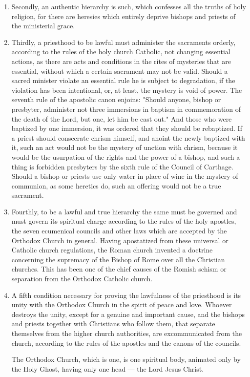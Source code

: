 \begin{enumerate}
    \item Secondly, an authentic hierarchy is such, 
    which confesses all the truths of holy religion, 
    for there are heresies which entirely deprive 
    bishops and priests of the ministerial grace. 

    \item Thirdly, a priesthood to be lawful must 
    administer the sacraments orderly, according 
    to the rules of the holy church Catholic, not 
    changing essential actions, as there are acts and 
    conditions in the rites of mysteries that are essential,
    without which a certain sacrament may 
    not be valid. Should a sacred minister violate 
    an essential rule he is subject to degradation, if 
    the violation has been intentional, or, at least, 
    the mystery is void of power. The seventh 
    rule of the apostolic canon enjoins: "Should 
    anyone, bishop or presbyter, administer not 
    three immersions in baptism in commemoration 
    of the death of the Lord, but one, let him be cast 
    out." And those who were baptized by one 
    immersion, it was ordered that they should be 
    rebaptized. If a priest should consecrate 
    chrism himself, and anoint the newly baptized 
    with it, such an act would not be the mystery of 
    unction with chrism, because it would be the 
    usurpation of the rights and the power of a 
    bishop, and such a thing is forbidden presbyters
    by the sixth rule of the Council of Carthage.
    Should a bishop or priests use only water 
    in place of wine in the mystery of communion, 
    as some heretics do, such an offering would not 
    be a true sacrament. 

    \item Fourthly, to be a lawful and true hierarchy
    the same must be governed and must govern 
    its spiritual charge according to the rules of the 
    holy apostles, the seven ecumenical councils 
    and other laws which are accepted by the 
    Orthodox Church in general. Having apostatized
    from these universal or Catholic church 
    regulations, the Roman church invented a 
    doctrine concerning the supremacy of the 
    Bishop of Rome over all the Christian churches. 
    This has been one of the chief causes of the 
    Romish schism or separation from the Orthodox
    Catholic church. 

    \item A fifth condition necessary for proving the 
    lawfulness of the priesthood is its unity with 
    the Orthodox Church in the spirit of peace and 
    love. Whoever destroys the unity, except for 
    a genuine and important cause, and the bishops 
    and priests together with Christians who follow 
    them, that separate themselves from the higher 
    church authorities, are excommunicated from 
    the church, according to the rules of the 
    apostles and the canons of the councils. 

    The Orthodox Church, which is one, is one 
    spiritual body, animated only by the Holy 
    Ghost, having only one head — the Lord Jesus 
    Christ. 
\end{enumerate}

